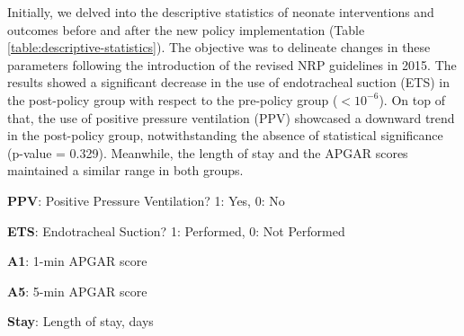 \documentclass[11pt]{article}
\begin{document}
Initially, we delved into the descriptive statistics of neonate interventions and outcomes before and after the new policy implementation (Table {}\ref{table:descriptive-statistics}). The objective was to delineate changes in these parameters following the introduction of the revised NRP guidelines in 2015. The results showed a significant decrease in the use of endotracheal suction (ETS) in the post-policy group with respect to the pre-policy group ($<$$10^{-6}$). On top of that, the use of positive pressure ventilation (PPV) showcased a downward trend in the post-policy group, notwithstanding the absence of statistical significance (p-value = 0.329). Meanwhile, the length of stay and the APGAR scores maintained a similar range in both groups.

\begin{table}[h]
\caption{Descriptive statistics of neonate interventions and outcomes stratified by new policy}
\label{table:descriptive-statistics}
\begin{threeparttable}
\renewcommand{\TPTminimum}{\linewidth}
\begin{tablenotes}
\footnotesize
\item \textbf{PPV}: Positive Pressure Ventilation? 1: Yes, 0: No
\item \textbf{ETS}: Endotracheal Suction? 1: Performed, 0: Not Performed
\item \textbf{A1}: 1-min APGAR score
\item \textbf{A5}: 5-min APGAR score
\item \textbf{Stay}: Length of stay, days
\end{tablenotes}
\end{threeparttable}
\end{table}
\end{document}
